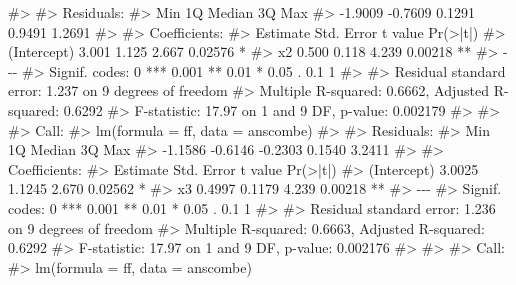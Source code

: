 \documentclass[
  letterpaper,
  DIV=11,
  numbers=noendperiod]{scrreprt}
\newenvironment{Shaded}{\begin{snugshade}}{\end{snugshade}}
\newcommand{\CommentTok}[1]{\textcolor[rgb]{0.37,0.37,0.37}{#1}}
\begin{document}
\begin{Shaded}
\begin{Highlighting}[]
\CommentTok{\#\textgreater{} }
\CommentTok{\#\textgreater{} Residuals:}
\CommentTok{\#\textgreater{}     Min      1Q  Median      3Q     Max }
\CommentTok{\#\textgreater{} {-}1.9009 {-}0.7609  0.1291  0.9491  1.2691 }
\CommentTok{\#\textgreater{} }
\CommentTok{\#\textgreater{} Coefficients:}
\CommentTok{\#\textgreater{}             Estimate Std. Error t value Pr(\textgreater{}|t|)   }
\CommentTok{\#\textgreater{} (Intercept)    3.001      1.125   2.667  0.02576 * }
\CommentTok{\#\textgreater{} x2             0.500      0.118   4.239  0.00218 **}
\CommentTok{\#\textgreater{} {-}{-}{-}}
\CommentTok{\#\textgreater{} Signif. codes:  0 \textquotesingle{}***\textquotesingle{} 0.001 \textquotesingle{}**\textquotesingle{} 0.01 \textquotesingle{}*\textquotesingle{} 0.05 \textquotesingle{}.\textquotesingle{} 0.1 \textquotesingle{} \textquotesingle{} 1}
\CommentTok{\#\textgreater{} }
\CommentTok{\#\textgreater{} Residual standard error: 1.237 on 9 degrees of freedom}
\CommentTok{\#\textgreater{} Multiple R{-}squared:  0.6662, Adjusted R{-}squared:  0.6292 }
\CommentTok{\#\textgreater{} F{-}statistic: 17.97 on 1 and 9 DF,  p{-}value: 0.002179}
\CommentTok{\#\textgreater{} }
\CommentTok{\#\textgreater{} }
\CommentTok{\#\textgreater{} Call:}
\CommentTok{\#\textgreater{} lm(formula = ff, data = anscombe)}
\CommentTok{\#\textgreater{} }
\CommentTok{\#\textgreater{} Residuals:}
\CommentTok{\#\textgreater{}     Min      1Q  Median      3Q     Max }
\CommentTok{\#\textgreater{} {-}1.1586 {-}0.6146 {-}0.2303  0.1540  3.2411 }
\CommentTok{\#\textgreater{} }
\CommentTok{\#\textgreater{} Coefficients:}
\CommentTok{\#\textgreater{}             Estimate Std. Error t value Pr(\textgreater{}|t|)   }
\CommentTok{\#\textgreater{} (Intercept)   3.0025     1.1245   2.670  0.02562 * }
\CommentTok{\#\textgreater{} x3            0.4997     0.1179   4.239  0.00218 **}
\CommentTok{\#\textgreater{} {-}{-}{-}}
\CommentTok{\#\textgreater{} Signif. codes:  0 \textquotesingle{}***\textquotesingle{} 0.001 \textquotesingle{}**\textquotesingle{} 0.01 \textquotesingle{}*\textquotesingle{} 0.05 \textquotesingle{}.\textquotesingle{} 0.1 \textquotesingle{} \textquotesingle{} 1}
\CommentTok{\#\textgreater{} }
\CommentTok{\#\textgreater{} Residual standard error: 1.236 on 9 degrees of freedom}
\CommentTok{\#\textgreater{} Multiple R{-}squared:  0.6663, Adjusted R{-}squared:  0.6292 }
\CommentTok{\#\textgreater{} F{-}statistic: 17.97 on 1 and 9 DF,  p{-}value: 0.002176}
\CommentTok{\#\textgreater{} }
\CommentTok{\#\textgreater{} }
\CommentTok{\#\textgreater{} Call:}
\CommentTok{\#\textgreater{} lm(formula = ff, data = anscombe)}

\end{Highlighting}
\end{Shaded}
\end{document}
